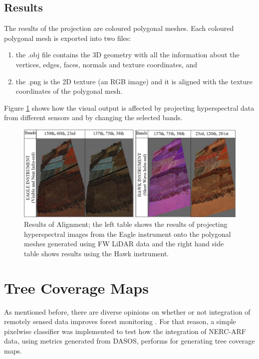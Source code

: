 \documentclass{subfiles}
\begin{document}
	\subsection {Results}
	

		\par The results of the projection are coloured polygonal meshes. Each coloured polygonal mesh is exported into two files:
		\begin{enumerate}
			\item the .obj file contains the 3D geometry with all the information about the vertices, edges, faces, normals and texture coordinates, and
			\item the .png is the 2D texture (an RGB image) and it is aligned with the texture coordinates of the polygonal mesh.
		\end{enumerate} 
		
		 \par Figure \ref{fig:AlignmentResults} shows how the visual output is affected by projecting hyperspectral data from different sensors and by changing the selected bands. 
		
			
		
		\begin{figure} [h!]
		  	\centering
		  	\includegraphics[width=\textwidth]{img/AlignmentEagle_Hawk}
		  	\caption[Results of Alignment]{Results of Alignment; the left table shows the results of projecting hyperspectral images from the Eagle instrument onto the polygonal meshes generated using FW LiDAR data and the right hand side table shows results using the Hawk instrument.}
		  	\label{fig:AlignmentResults}
		\end{figure}
		
	\newpage	
\section{Tree Coverage Maps}

\par As mentioned before, there are diverse opinions on whether or not integration of remotely sensed data improves forest monitoring \cite{Clark2011} \cite{Anderson2008}. For that reason, a simple pixelwise classifier was implemented to test how the integration of NERC-ARF data, using metrics generated from DASOS, performs for generating tree coverage maps.  
\end{document}
